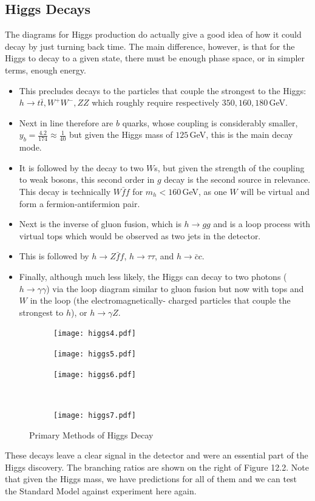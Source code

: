 \documentclass[relqm.tex]{subfiles}
\begin{document}
\subsection{Higgs Decays}
The diagrams for Higgs production do actually give a good idea of how it could decay by just turning back time. 
The main difference, however, is that for the Higgs to decay to a given state, there must be enough phase space, or in simpler terms, enough energy. 
\begin{itemize}
    \item This precludes decays to the particles that couple the strongest to the Higgs: $h\to t\bar{t},W^+W^-,ZZ$ which roughly require respectively $350,160,180\,$GeV.
    \item Next in line therefore are $b$ quarks, whose coupling is considerably smaller, $y_b=\frac{4.2}{174}\approx\frac{1}{40}$ but given the Higgs mass of $125\,$GeV, this is the main decay mode.
    \item It is followed by the decay to two $W$s, but given the strength of the coupling to weak bosons, this second order in $g$ decay is the second source in relevance.
        This decay is technically $W\bar{f}f$ for $m_h<160\,$GeV, as one $W$ will be virtual and form a fermion-antifermion pair. 
    \item Next is the inverse of gluon fusion, which is $h\to gg$ and is a loop process with virtual tops which would be observed as two jets in the detector. 
    \item This is followed by $h\to Z\bar{f}f$, $h\to\tau\tau$, and $h\to\bar{c}c$.
    \item Finally, although much less likely, the Higgs can decay to two photons ($h\to\gamma\gamma$) via the loop diagram similar to gluon fusion but now with tops and $W$ in the loop (the electromagnetically- charged particles that couple the strongest to $h$), or $h\to\gamma Z$.
\end{itemize}
\begin{figure}[H]
    \centering
    \begin{subfigure}[c]{0.3\textwidth}
        \centering
        \texttt{[image: higgs4.pdf]}
    \end{subfigure}
    \begin{subfigure}[c]{0.3\textwidth}
        \texttt{[image: higgs5.pdf]}
    \end{subfigure}
    \begin{subfigure}[c]{0.3\textwidth}
        \texttt{[image: higgs6.pdf]}
    \end{subfigure}\\
    \begin{subfigure}[c]{0.7\textwidth}
        \texttt{[image: higgs7.pdf]}
    \end{subfigure}
    \caption{Primary Methods of Higgs Decay}
\end{figure}
These decays leave a clear signal in the detector and were an essential part of the Higgs discovery.
The branching ratios are shown on the right of Figure 12.2.
Note that given the Higgs mass, we have predictions for all of them and we can test the Standard Model against experiment here again.
\end{document}
